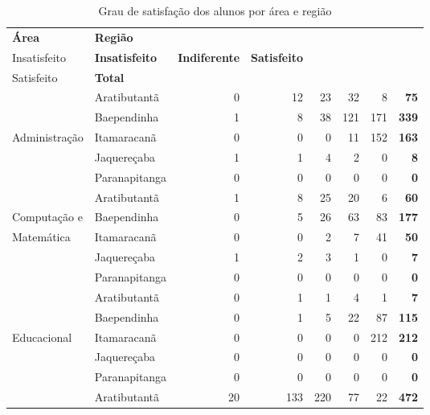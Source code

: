 \begin{table}[h]
\scriptsize
\centering
\caption{Grau de satisfação dos alunos por área e região}
\vspace{0.5em}
\label{tabela:q15}
\begin{tabular}{llrrrrrr}
\toprule
\textbf{Área} & \textbf{Região} &  \textbf{\specialcell{c}{Muito\\Insatisfeito}} &  \textbf{Insatisfeito} &  \textbf{ Indiferente} &  \textbf{ Satisfeito} & \textbf{\specialcell{c}{Muito\\Satisfeito}} & \textbf{Total} \\
   \midrule
					& Aratibutantã  &   0 &  12 &  23 &  32 &   8 & \textbf{75}\\ 
                    & Baependinha   &   1 &   8 &  38 & 121 & 171 & \textbf{339}\\ 
   Administração    & Itamaracanã   &   0 &   0 &   0 &  11 & 152 & \textbf{163}\\ 
                    & Jaquereçaba   &   1 &   1 &   4 &   2 &   0 & \textbf{8}\\ 
                    & Paranapitanga &   0 &   0 &   0 &   0 &   0 & \textbf{0}\\ 
\midrule
					& Aratibutantã  &   1 &   8 &  25 &  20 &   6 & \textbf{60}\\ 
	Computação e    & Baependinha   &   0 &   5 &  26 &  63 &  83 & \textbf{177}\\ 
	Matemática  	& Itamaracanã   &   0 &   0 &   2 &   7 &  41 & \textbf{50}\\ 
					& Jaquereçaba   &   1 &   2 &   3 &   1 &   0 & \textbf{7}\\ 
                    & Paranapitanga	&   0 &   0 &   0 &   0 &   0 & \textbf{0}\\ 
\midrule
					& Aratibutantã  &   0 &   1 &   1 &   4 &   1 & \textbf{7}\\ 
                    & Baependinha   &   0 &   1 &   5 &  22 &  87 & \textbf{115}\\ 
  Educacional       & Itamaracanã   &   0 &   0 &   0 &   0 & 212 & \textbf{212}\\ 
                    & Jaquereçaba   &   0 &   0 &   0 &   0 &   0 & \textbf{0}\\ 
                    & Paranapitanga &   0 &   0 &   0 &   0 &   0 & \textbf{0}\\ 
\midrule			
					& Aratibutantã  &  20 & 133 & 220 &  77 &  22 & \textbf{472}\\ 

\end{tabular}
\end{table}
